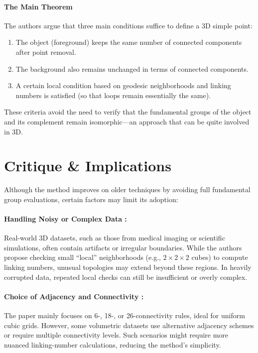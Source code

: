 \documentclass{llncs}
\begin{document}
\paragraph{The Main Theorem}
The authors argue that three main conditions suffice to define a 3D simple point:
\begin{enumerate}
    \item The object (foreground) keeps the same number of connected components after point removal.
    \item The background also remains unchanged in terms of connected components.
    \item A certain local condition based on geodesic neighborhoods and linking numbers is satisfied (so that loops remain essentially the same).
\end{enumerate}
These criteria avoid the need to verify that the fundamental groups of the object and its complement remain isomorphic—an approach that can be quite involved in 3D.

\section*{Critique \& Implications}

Although the method improves on older techniques by avoiding full fundamental group evaluations, certain factors may limit its adoption:

\paragraph{Handling Noisy or Complex Data :}
Real-world 3D datasets, such as those from medical imaging or scientific simulations, often contain artifacts or irregular boundaries. While the authors propose checking small “local” neighborhoods (e.g., $2\times2\times2$ cubes) to compute linking numbers, unusual topologies may extend beyond these regions. In heavily corrupted data, repeated local checks can still be insufficient or overly complex.

\paragraph{Choice of Adjacency and Connectivity :}
The paper mainly focuses on 6-, 18-, or 26-connectivity rules, ideal for uniform cubic grids. However, some volumetric datasets use alternative adjacency schemes or require multiple connectivity levels. Such scenarios might require more nuanced linking-number calculations, reducing the method’s simplicity.
\end{document}
